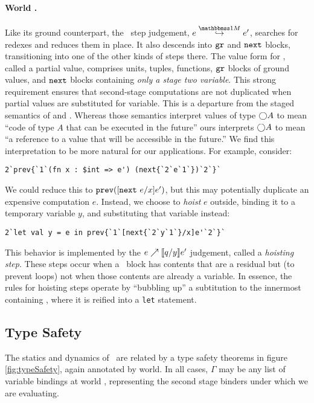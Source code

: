 \paragraph{World \bbonem.}
Like its ground counterpart, the \bbonem\ step judgement, $\stepmix e {e'}$, searches for redexes and reduces them in place.
It also descends into ${\tt gr}$ and ${\tt next}$ blocks, transitioning into one of the other kinds of steps there. 
The value form for \bbonem, called a partial value, comprises units, tuples, functions, ${\tt gr}$ blocks of ground values, and ${\tt next}$ blocks containing \emph{only a stage two variable}.
This strong requirement ensures that second-stage computations are not duplicated when partial values are substituted for variable.
This is a departure from the staged semantics of \cite{taha-thesis-99} and \cite{davies96}.
Whereas those semantics interpret values of type $\bigcirc A$ to mean ``code of type $A$ that can be executed in the future''
ours interprets $\bigcirc A$ to mean ``a reference to a value that will be accessible in the future.''
We find this interpretation to be more natural for our applications.
For example, consider:
\begin{lstlisting}
2`prev{`1`(fn x : $int => e') (next{`2`e`1`})`2`}`
\end{lstlisting}
We could reduce this to ${\tt prev}([{\tt next}~e/x]e')$, but this may potentially duplicate an
expensive computation $e$. Instead, we choose to \emph{hoist} $e$ outside, binding it
to a temporary variable $y$, and substituting that variable instead:
\begin{lstlisting} 
2`let val y = e in prev{`1`[next{`2`y`1`}/x]e'`2`}`
\end{lstlisting}
This behavior is implemented by the ${e}\nearrow \llbracket q/y \rrbracket{e'}$ judgement, called a \emph{hoisting step}.
These steps occur when a \next\ block has contents that are a residual but (to prevent loops) not when those contents are already a variable.
In essence, the rules for hoisting steps operate by ``bubbling up'' a subtitution to the innermost containing \prev,
where it is reified into a {\tt let} statement.

\subsection{Type Safety}

The statics and dynamics of \lang\ are related by a type safety theorems
in figure \ref{fig:typeSafety}, again annotated by world.
In all cases, $\Gamma$ may be any list of variable bindings at world \bbtwo,
representing the second stage binders under which we are evaluating.


